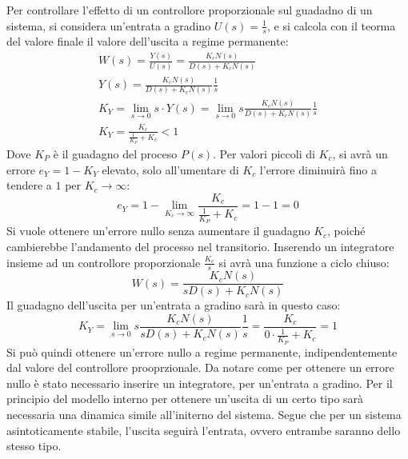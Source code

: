 \documentclass{article}
\numberwithin{equation}{subsection}
\begin{document}
Per controllare l'effetto di un controllore proporzionale sul guadadno di un sistema, si considera un'entrata a gradino $U(s)=\displaystyle\frac{1}{s}$, e si calcola con 
il teorma del valore finale il valore dell'uscita a regime permanente:
\begin{gather}
    W(s)=\displaystyle\frac{Y(s)}{U(s)}=\frac{K_cN(s)}{D(s)+K_cN(s)}\\
    Y(s)=\displaystyle\frac{K_c N(s)}{D(s)+K_c N(s)}\frac{1}{s}\\
    K_Y=\lim_{s\to0}s\cdot Y(s)=\lim_{s\to0}s\displaystyle\frac{K_c N(s)}{D(s)+K_c N(s)}\frac{1}{s}\\
    K_Y=\displaystyle\frac{K_c}{\displaystyle\frac{1}{K_P}+K_c}<1
\end{gather}
Dove $K_P$ è il guadagno del proceso $P(s)$. Per valori piccoli di $K_c$, si avrà un errore $e_Y=1-K_Y$ elevato, solo all'umentare di $K_c$ l'errore diminuirà fino a tendere 
a $1$ per $K_c\to\infty$: 
\begin{equation}
    e_Y=1-\lim_{K_c\to\infty}\displaystyle\frac{K_c}{\displaystyle\frac{1}{K_P}+K_c}=1-1=0
\end{equation}
Si vuole ottenere un'errore nullo senza aumentare il guadagno $K_c$, poiché cambierebbe l'andamento del processo nel transitorio. Inserendo un integratore insieme ad 
un controllore proporzionale $\displaystyle\frac{K_c}{s}$ si avrà una funzione a ciclo chiuso:
\begin{equation}
    W(s)=\displaystyle\frac{K_cN(s)}{sD(s)+K_cN(s)}
\end{equation}
Il guadagno dell'uscita per un'entrata a gradino sarà in questo caso:
\begin{equation}
    K_Y=\lim_{s\to0}s\displaystyle\frac{K_c N(s)}{sD(s)+K_c N(s)}\frac{1}{s}=\frac{K_c}{0\cdot\displaystyle\frac{1}{K_P}+K_c}=1
\end{equation}
Si può quindi ottenere un'errore nullo a regime permanente, indipendentemente dal valore del controllore prooprzionale. Da notare come per ottenere un errore nullo è stato 
necessario inserire un integratore, per un'entrata a gradino. Per il principio del modello interno per ottenere un'uscita di un certo tipo sarà necessaria una dinamica 
simile all'initerno del sistema. Segue che per un sistema asintoticamente stabile, l'uscita seguirà l'entrata, ovvero entrambe saranno dello stesso tipo. 
\end{document}
